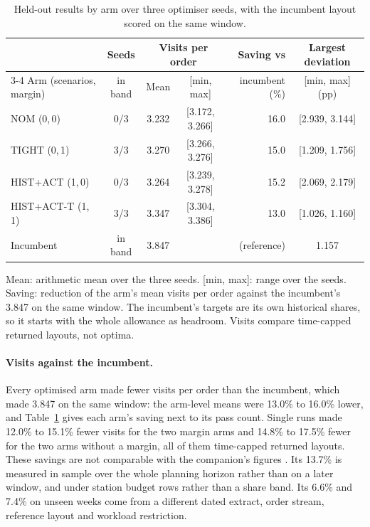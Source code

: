 \begin{table}[htbp]
\centering
\caption{Held-out results by arm over three optimiser seeds, with the incumbent layout scored on the same window.}
\label{tab:heldout_arms}
\small
\setlength{\tabcolsep}{4pt}
\begin{tabular}{@{}lcccrc@{}}
\toprule
 & Seeds & \multicolumn{2}{c}{Visits per order} & Saving vs & Largest deviation \\
\cmidrule(lr){3-4}
Arm (scenarios, margin) & in band & Mean & [min, max] & incumbent (\%) & [min, max] (pp) \\
\midrule
NOM (0,\,0)        & 0/3 & 3.232 & [3.172, 3.266] & 16.0 & [2.939, 3.144] \\
TIGHT (0,\,1)      & 3/3 & 3.270 & [3.266, 3.276] & 15.0 & [1.209, 1.756] \\
HIST+ACT (1,\,0)   & 0/3 & 3.264 & [3.239, 3.278] & 15.2 & [2.069, 2.179] \\
HIST+ACT-T (1,\,1) & 3/3 & 3.347 & [3.304, 3.386] & 13.0 & [1.026, 1.160] \\
\midrule
Incumbent          & in band & 3.847 &  & (reference) & 1.157 \\
\bottomrule
\end{tabular}
\par\smallskip
\begin{minipage}{\linewidth}\footnotesize
Mean: arithmetic mean over the three seeds. [min, max]: range over the seeds. Saving: reduction of the arm's mean visits per order against the incumbent's 3.847 on the same window. The incumbent's targets are its own historical shares, so it starts with the whole allowance as headroom. Visits compare time-capped returned layouts, not optima.
\end{minipage}
\end{table}

\paragraph{Visits against the incumbent.} Every optimised arm made fewer visits per order than the incumbent, which made 3.847 on the same window: the arm-level means were 13.0\% to 16.0\% lower, and Table~\ref{tab:heldout_arms} gives each arm's saving next to its pass count. Single runs made 12.0\% to 15.1\% fewer visits for the two margin arms and 14.8\% to 17.5\% fewer for the two arms without a margin, all of them time-capped returned layouts. These savings are not comparable with the companion's figures \citep{belul_companion}. Its 13.7\% is measured in sample over the whole planning horizon rather than on a later window, and under station budget rows rather than a share band. Its 6.6\% and 7.4\% on unseen weeks come from a different dated extract, order stream, reference layout and workload restriction.

